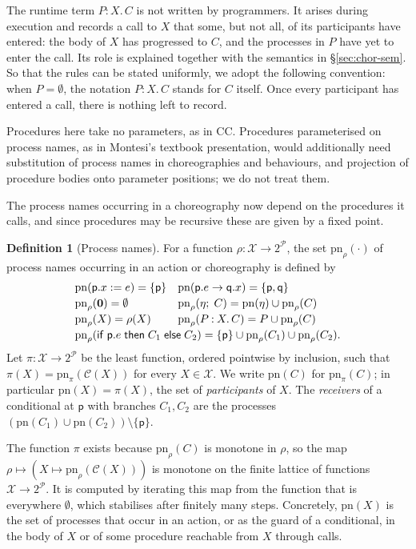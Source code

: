 \documentclass[11pt]{article}
\theoremstyle{plain}
\theoremstyle{definition}
\newtheorem{definition}[theorem]{Definition}
\theoremstyle{remark}
\newcommand{\kw}[1]{\mathsf{#1}}
\newcommand{\kif}{\kw{if}\;}
\newcommand{\kthen}{\;\kw{then}\;}
\newcommand{\kelse}{\;\kw{else}\;}
\newcommand{\nil}{\mathbf{0}}
\newcommand{\seq}{;\;}
\newcommand{\pp}{\mathsf{p}}
\newcommand{\qq}{\mathsf{q}}
\newcommand{\Procs}{\mathcal{P}}
\newcommand{\pn}{\mathrm{pn}}
\newcommand{\ifcond}[3]{\kif #1 \kthen #2 \kelse #3}
\newcommand{\Pnames}{\mathcal{X}}
\newcommand{\Defs}{\mathcal{C}}
\newcommand{\body}[1]{\Defs(#1)}
\newcommand{\rt}[3]{#1\mathbin{:}#2.\,#3}
\begin{document}
The runtime term $\rt{P}{X}{C}$ is not written by programmers.  It arises
during execution and records a call to $X$ that some, but not all, of its
participants have entered: the body of $X$ has progressed to $C$, and the
processes in $P$ have yet to enter the call.  Its role is explained together
with the semantics in \S\ref{sec:chor-sem}.  So that the rules can be stated
uniformly, we adopt the following convention: when $P = \emptyset$, the
notation $\rt{P}{X}{C}$ stands for $C$ itself.  Once every participant has
entered a call, there is nothing left to record.

Procedures here take no parameters, as in CC.  Procedures parameterised on
process names, as in Montesi's textbook presentation, would additionally need
substitution of process names in choreographies and behaviours, and
projection of procedure bodies onto parameter positions; we do not treat them.

The process names occurring in a choreography now depend on the procedures it
calls, and since procedures may be recursive these are given by a fixed point.

\begin{definition}[Process names]\label{def:pn}
  For a function $\rho : \Pnames \to 2^{\Procs}$, the set $\pn_\rho(\cdot)$ of
  process names occurring in an action or choreography is defined by
  \[
  \begin{array}{l@{\quad}l}
    \pn(\pp.x := e) = \{\pp\} &
    \pn(\pp.e \to \qq.x) = \{\pp,\qq\}\\[0.5ex]
    \pn_\rho(\nil) = \emptyset &
    \pn_\rho(\eta \seq C) = \pn(\eta) \cup \pn_\rho(C)\\[0.5ex]
    \pn_\rho(X) = \rho(X) &
    \pn_\rho(\rt{P}{X}{C}) = P \cup \pn_\rho(C)\\[0.5ex]
    \multicolumn{2}{l}{
    \pn_\rho(\ifcond{\pp.e}{C_1}{C_2}) = \{\pp\}\cup\pn_\rho(C_1)\cup\pn_\rho(C_2).}
  \end{array}
  \]
  Let $\pi : \Pnames \to 2^{\Procs}$ be the least function, ordered pointwise
  by inclusion, such that $\pi(X) = \pn_\pi(\body{X})$ for every
  $X\in\Pnames$.  We write $\pn(C)$ for $\pn_\pi(C)$; in particular
  $\pn(X) = \pi(X)$, the set of \emph{participants} of $X$.  The
  \emph{receivers} of a conditional at $\pp$ with branches $C_1,C_2$ are the
  processes $(\pn(C_1)\cup\pn(C_2)) \setminus \{\pp\}$.
\end{definition}

The function $\pi$ exists because $\pn_\rho(C)$ is monotone in $\rho$, so
the map $\rho \mapsto (X \mapsto \pn_\rho(\body{X}))$ is monotone on the
finite lattice of functions $\Pnames\to 2^{\Procs}$.  It is computed by
iterating this map from the function that is everywhere $\emptyset$, which
stabilises after finitely many steps.  Concretely, $\pn(X)$ is the set of
processes that occur in an action, or as the guard of a conditional, in the
body of $X$ or of some procedure reachable from $X$ through calls.
\end{document}
